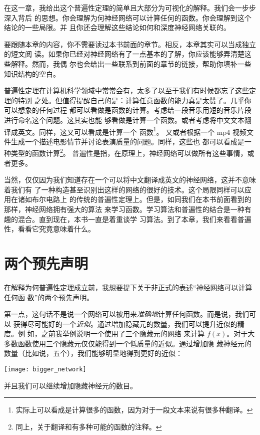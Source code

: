 在这一章，我给出这个普遍性定理的简单且大部分为可视化的解释。我们会一步步深入背后
的思想。你会理解为何神经网络可以计算任何的函数。你会理解到这个结论的一些局限。并
且你还会理解这些结论如何和深度神经网络关联的。

要跟随本章的内容，你不需要读过本书前面的章节。相反，本章其实可以当成独立的短文阅
读。如果你已经对神经网络有了一点基本的了解，你应该能够弄清楚这些解释。然而，我偶
尔也会给出一些联系到前面的章节的链接，帮助你填补一些知识结构的空白。

普遍性定理在计算机科学领域中常常会有，太多了以至于我们有时候都忘了这些定理的特别
之处。但值得提醒自己的是：计算任意函数的能力真是太赞了。几乎你可以想象的任何过程
都可以看做是函数的计算。考虑给一段音乐用短的音乐片段进行命名这个问题。这其实也能
够看做是计算一个函数。或者考虑将中文文本翻译成英文。同样，这又可以看成是计算一个
函数\footnote{实际上可以看成是计算很多的函数，因为对于一段文本来说有很多种翻译。}。
又或者根据一个 mp4 视频文件生成一个描述电影情节并讨论表演质量的问题。同样，这些也
都可以看成是一种类型的函数计算\footnote{同上，关于翻译和有多种可能的函数的注释。}。
普遍性是指，在原理上，神经网络可以做所有这些事情，或者更多。

当然，仅仅因为我们知道存在一个可以将中文翻译成英文的神经网络，这并不意味着我们有
了一种构造甚至识别出这样的网络的很好的技术。这个局限同样可以应用在诸如布尔电路上
的传统的普遍性定理上。但是，如同我们在本书前面看到的那样，神经网络拥有强大的算法
来学习函数。学习算法和普遍性的结合是一种有趣的混合。直到现在，本书一直是着重谈学
习算法。到了本章，我们来看看普遍性，看看它究竟意味着什么。

\section{两个预先声明}
\label{sec:two_caveats}

在解释为何普遍性定理成立前，我想要提下关于非正式的表述“神经网络可以计算任何函
数”的两个预先声明。

第一点，这句话不是说一个网络可以被用来\emph{准确地}计算任何函数。而是说，我们可以
获得尽可能好的一个\emph{近似}。通过增加隐藏元的数量，我们可以提升近似的精度。例
如，\hyperref[basic_network_precursor]{之前}我举例说明一个使用了三个隐藏元的网络
来计算 $f(x)$。对于大多数函数使用三个隐藏元仅仅能得到一个低质量的近似。通过增加隐
藏神经元的数量（比如说，五个），我们能够明显地得到更好的近似：
\begin{center}
  \texttt{[image: bigger\_network]}
\end{center}

并且我们可以继续增加隐藏神经元的数目。

